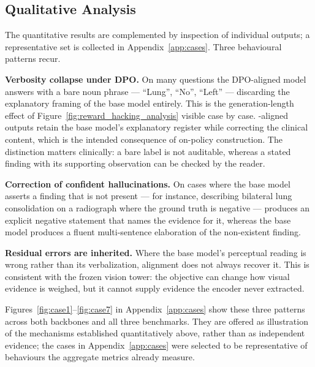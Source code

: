 \subsection{Qualitative Analysis}
\label{sec:res:qualitative}

The quantitative results are complemented by inspection of individual outputs; a representative set is collected in Appendix~\ref{app:cases}. Three behavioural patterns recur.

\textbf{Verbosity collapse under DPO.} On many questions the DPO-aligned model answers with a bare noun phrase --- ``Lung'', ``No'', ``Left'' --- discarding the explanatory framing of the base model entirely. This is the generation-length effect of Figure~\ref{fig:reward_hacking_analysis} visible case by case. \ourloss{}-aligned outputs retain the base model's explanatory register while correcting the clinical content, which is the intended consequence of on-policy construction. The distinction matters clinically: a bare label is not auditable, whereas a stated finding with its supporting observation can be checked by the reader.

\textbf{Correction of confident hallucinations.} On cases where the base model asserts a finding that is not present --- for instance, describing bilateral lung consolidation on a radiograph where the ground truth is negative --- \ourloss{} produces an explicit negative statement that names the evidence for it, whereas the base model produces a fluent multi-sentence elaboration of the non-existent finding.

\textbf{Residual errors are inherited.} Where the base model's perceptual reading is wrong rather than its verbalization, alignment does not always recover it. This is consistent with the frozen vision tower: the objective can change how visual evidence is weighed, but it cannot supply evidence the encoder never extracted.

Figures~\ref{fig:case1}--\ref{fig:case7} in Appendix~\ref{app:cases} show these three patterns across both backbones and all three benchmarks. They are offered as illustration of the mechanisms established quantitatively above, rather than as independent evidence; the cases in Appendix~\ref{app:cases} were selected to be representative of behaviours the aggregate metrics already measure.
